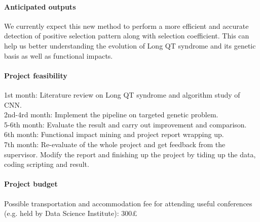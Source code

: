\documentclass[11pt,a4paper]{article}
\begin{document}
\paragraph{Anticipated outputs}
We currently expect this new method to perform a more efficient and accurate detection of positive selection pattern along with selection coefficient. This can help us better understanding the evolution of Long QT syndrome and its genetic basis as well as functional impacts.

\paragraph{Project feasibility}
1st month: Literature review on Long QT syndrome and algorithm study of CNN.  
\\
2nd-4rd month: Implement the pipeline on targeted genetic problem.
\\
5-6th month: Evaluate the result and carry out improvement and comparison. 
\\
6th month: Functional impact mining and project report wrapping up.
\\
7th month: Re-evaluate of the whole project and get feedback from the supervisor. Modify the report and finishing up the project by tiding up the data, coding scripting and result.

\paragraph{Project budget}
Possible transportation and accommodation fee for attending useful conferences (e.g. held by Data Science Institute): 300£

\newpage



\end{document}
